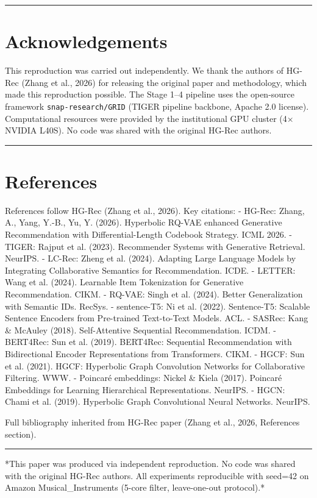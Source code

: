 \documentclass[11pt]{article}
\begin{document}
\noindent\rule{\textwidth}{0.4pt}

\section*{Acknowledgements}
This reproduction was carried out independently. We thank the authors of HG-Rec (Zhang et al., 2026) for releasing the original paper and methodology, which made this reproduction possible. The Stage 1--4 pipeline uses the open-source framework \texttt{snap-research/GRID} (TIGER pipeline backbone, Apache 2.0 license). Computational resources were provided by the institutional GPU cluster (4$\times$ NVIDIA L40S). No code was shared with the original HG-Rec authors.

\noindent\rule{\textwidth}{0.4pt}


\section{References}


References follow HG-Rec (Zhang et al., 2026). Key citations:
- HG-Rec: Zhang, A., Yang, Y.-B., Yu, Y. (2026). Hyperbolic RQ-VAE enhanced Generative Recommendation with Differential-Length Codebook Strategy. ICML 2026.
- TIGER: Rajput et al. (2023). Recommender Systems with Generative Retrieval. NeurIPS.
- LC-Rec: Zheng et al. (2024). Adapting Large Language Models by Integrating Collaborative Semantics for Recommendation. ICDE.
- LETTER: Wang et al. (2024). Learnable Item Tokenization for Generative Recommendation. CIKM.
- RQ-VAE: Singh et al. (2024). Better Generalization with Semantic IDs. RecSys.
- sentence-T5: Ni et al. (2022). Sentence-T5: Scalable Sentence Encoders from Pre-trained Text-to-Text Models. ACL.
- SASRec: Kang \& McAuley (2018). Self-Attentive Sequential Recommendation. ICDM.
- BERT4Rec: Sun et al. (2019). BERT4Rec: Sequential Recommendation with Bidirectional Encoder Representations from Transformers. CIKM.
- HGCF: Sun et al. (2021). HGCF: Hyperbolic Graph Convolution Networks for Collaborative Filtering. WWW.
- Poincaré embeddings: Nickel \& Kiela (2017). Poincaré Embeddings for Learning Hierarchical Representations. NeurIPS.
- HGCN: Chami et al. (2019). Hyperbolic Graph Convolutional Neural Networks. NeurIPS.

Full bibliography inherited from HG-Rec paper (Zhang et al., 2026, References section).

\noindent\rule{\textwidth}{0.4pt}

*This paper was produced via independent reproduction. No code was shared with the original HG-Rec authors. All experiments reproducible with seed=42 on Amazon Musical\_Instruments (5-core filter, leave-one-out protocol).*
\end{document}
